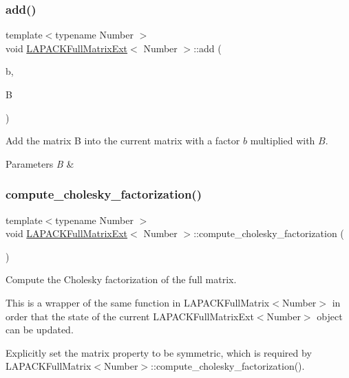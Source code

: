\subsubsection{\texorpdfstring{add()}{add()}\hspace{0.1cm}{\footnotesize\ttfamily [4/4]}}
{\footnotesize\ttfamily template$<$typename Number $>$ \\
void \hyperlink{classLAPACKFullMatrixExt}{L\+A\+P\+A\+C\+K\+Full\+Matrix\+Ext}$<$ Number $>$\+::add (\begin{DoxyParamCaption}\item[{const Number}]{b,  }\item[{const \hyperlink{classLAPACKFullMatrixExt}{L\+A\+P\+A\+C\+K\+Full\+Matrix\+Ext}$<$ Number $>$ \&}]{B }\end{DoxyParamCaption})}

Add the matrix {\ttfamily B} into the current matrix with a factor $b$ multiplied with $B$. 
\begin{DoxyParams}{Parameters}
{\em B} & \\
\hline
\end{DoxyParams}
\mbox{\label{classLAPACKFullMatrixExt_a6aaaec84d900ee2dface5b80614ce30f}} 
\subsubsection{\texorpdfstring{compute\+\_\+cholesky\+\_\+factorization()}{compute\_cholesky\_factorization()}}
{\footnotesize\ttfamily template$<$typename Number $>$ \\
void \hyperlink{classLAPACKFullMatrixExt}{L\+A\+P\+A\+C\+K\+Full\+Matrix\+Ext}$<$ Number $>$\+::compute\+\_\+cholesky\+\_\+factorization (\begin{DoxyParamCaption}{ }\end{DoxyParamCaption})}

Compute the Cholesky factorization of the full matrix.


\begin{DoxyDescription}
\item[Note ]This is a wrapper of the same function in {\ttfamily L\+A\+P\+A\+C\+K\+Full\+Matrix$<$\+Number$>$} in order that the {\ttfamily state} of the current {\ttfamily L\+A\+P\+A\+C\+K\+Full\+Matrix\+Ext$<$\+Number$>$} object can be updated. 
\end{DoxyDescription}Explicitly set the matrix property to be {\ttfamily symmetric}, which is required by {\ttfamily L\+A\+P\+A\+C\+K\+Full\+Matrix$<$\+Number$>$\+::compute\+\_\+cholesky\+\_\+factorization()}.

